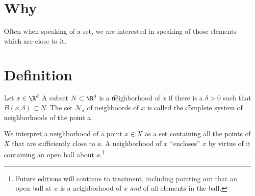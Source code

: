 

\section*{Why}

Often when speaking of a set, we are interested in speaking of those elements which are close to it.

\section*{Definition}

Let $x \in \R ^d$
A subset $N \subset \R ^d$ is a \t{neighborhood of $x$} if there is a $\delta  > 0$ such that $B(x, \delta ) \subset N$.
The set $\mathcal{N} _a$ of neighboords of $x$ is called the \t{complete system of neighborhoods} of the point $a$.

We interpret a neighborhood of a point $x \in X$ as a set containing all the points of $X$ that are sufficiently close to $a$.
A neighborhood of $x$ ``encloses'' $x$ by virtue of it containing an open ball about $a$.\footnote{Future editions will continue to treatment, including pointing out that an open ball at $x$ is a neighborhood of $x$ \textit{and} of all elements in the ball.}

\blankpage